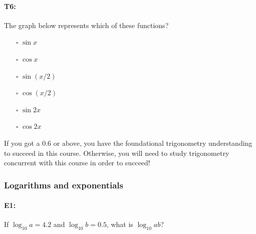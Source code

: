\documentclass[pdftex, brazil, 12pt, twoside]{article}
\begin{document}
\paragraph{T6:} The graph below represents which of these functions?

\begin{figure}[H]
  \begin{center}
    \label{fig:adv-t3}
  \end{center}
\end{figure}

\begin{itemize}[noitemsep]
\item[$\square$] $\sin{x}$
\item[$\square$] $\cos{x}$
\item[$\square$] $\sin{(x/2)}$
\item[$\square$] $\cos{(x/2)}$
\item[$\square$] $\sin{2x}$
\item[$\square$] $\cos{2x}$
\end{itemize}

If you got a 0.6 or above, you have the foundational trigonometry understanding to succeed in this course.
Otherwise, you will need to study trigonometry concurrent with this course in order to succeed!

\subsubsection{Logarithms and exponentials}
\label{gs-adventure-log}

\paragraph{E1:} If $\log_{10}{a}=4.2$ and $\log_{10}{b} = 0.5$, what is $\log_{10}{ab}$?
\end{document}
